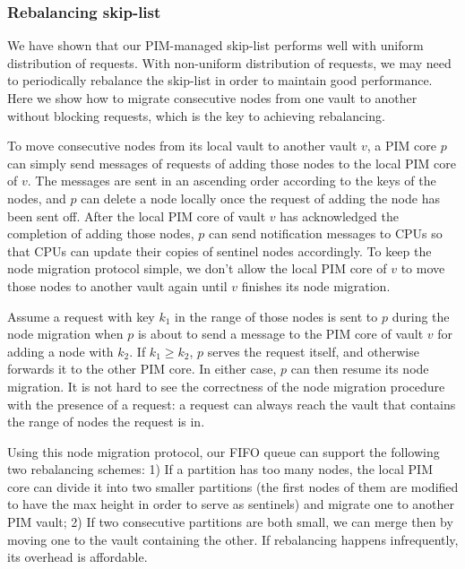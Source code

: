\documentclass[11pt, letterpaper]{article}   	%
\begin{document}
\subsubsection{Rebalancing skip-list}
We have shown that our PIM-managed skip-list performs well with uniform distribution of requests. 
With non-uniform distribution of requests, we may need to periodically rebalance the skip-list 
in order to maintain good performance. 
Here we show how to migrate consecutive nodes from one vault to another without blocking requests, 
which is the key to achieving rebalancing. 

To move consecutive nodes from its local vault to another vault $v$, a PIM core $p$ 
can simply send messages of requests of adding those nodes to the local PIM core of $v$. 
The messages are sent in an ascending order according to the keys of the nodes, and 
$p$ can delete a node locally once the request of adding the node has been sent off. 
After the local PIM core of vault $v$ has acknowledged the completion of adding those nodes, 
$p$ can send notification messages to CPUs so that 
CPUs can update their copies of sentinel nodes accordingly. 
To keep the node migration protocol simple, we don't allow the local PIM core of $v$ to 
move those nodes to another vault again until $v$ finishes its node migration. 

Assume a request with key $k_1$ in the range of those nodes is sent to $p$ 
during the node migration when $p$ is about to send a message to the PIM core of vault $v$ 
for adding a node with $k_2$.  
If $k_1 \ge k_2$, $p$ serves the request itself, and otherwise forwards it to the other PIM core. 
In either case, $p$ can then resume its node migration. 
It is not hard to see the correctness of the node migration procedure 
with the presence of a request: a request can always reach the vault that 
contains the range of nodes the request is in.

Using this node migration protocol, our FIFO queue can support the following two rebalancing schemes:
1) If a partition has too many nodes, the local PIM core can divide it into two smaller  
partitions (the first nodes of them are modified to have the max height in order to serve as sentinels) 
and migrate one to another PIM vault; 
2) If two consecutive partitions are both small, we can merge then by moving one to the vault 
containing the other. 
If rebalancing happens infrequently, its overhead is affordable. 
\end{document}
